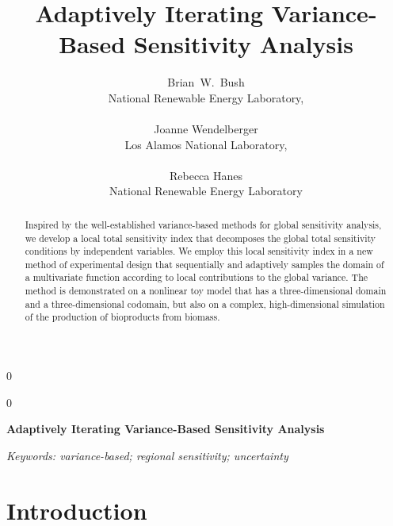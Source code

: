 \documentclass[12pt]{article}
\newcommand{\blind}{0}
\begin{document}
%

\def\spacingset#1{\renewcommand{\baselinestretch}%
{#1}\small\normalsize} \spacingset{1}



\blind
{
  \title{\bf Adaptively Iterating Variance-Based Sensitivity Analysis}
  \author{
    Brian\ W.\ Bush \\
    National Renewable Energy Laboratory, \\ \\
    Joanne Wendelberger \\
    Los Alamos National Laboratory, \\ \\
    Rebecca Hanes \\
    National Renewable Energy Laboratory
  }
  \maketitle
} \fi

\blind
{
  \bigskip
  \bigskip
  \bigskip
  \begin{center}
    {\LARGE\bf Adaptively Iterating Variance-Based Sensitivity Analysis}
\end{center}
  \medskip
} \fi

\bigskip
\begin{abstract}
Inspired by the well-established variance-based methods for global sensitivity analysis, we develop a local total sensitivity index that decomposes the global total sensitivity conditions by independent variables. We employ this local sensitivity index in a new method of experimental design that sequentially and adaptively samples the domain of a multivariate function according to local contributions to the global variance. The method is demonstrated on a nonlinear toy model that has a three-dimensional domain and a three-dimensional codomain, but also on a complex, high-dimensional simulation of the production of bioproducts from biomass. 
\end{abstract}

\noindent%
{\it Keywords: variance-based; regional sensitivity; uncertainty} 
\vfill

\newpage


\section{Introduction}
\end{document}
